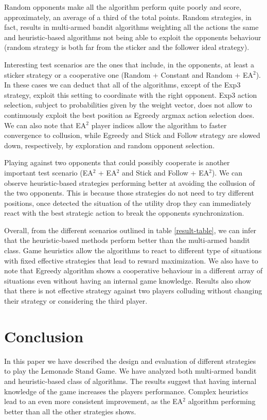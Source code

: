 \documentclass[runningheads]{llncs}
\begin{document}
Random opponents make all the algorithm perform quite
poorly and score, approximately, an average of a third of the total
points. Random strategies, in fact, results in multi-armed bandit
algorithms weighting all the actions the same and heuristic-based
algorithms not being able to exploit the opponents behaviour (random
strategy is both far from the sticker and the follower ideal strategy).

Interesting test scenarios are the ones that include, in the
opponents, at least a sticker strategy or a cooperative one (Random +
Constant and Random + EA$^2$). In these cases we can deduct that all
of the algorithms, except of the Exp3 strategy, exploit this setting
to coordinate with the right opponent. Exp3 action selection, subject
to probabilities given by the weight vector, does not allow to
continuously exploit the best position as Egreedy argmax action
selection does. We can also note that EA$^2$ player indices allow the
algorithm to faster convergence to collusion, while Egreedy and
Stick and Follow strategy are slowed down, respectively, by
exploration and random opponent selection.

Playing against two opponents that could possibly cooperate is another
important test scenario (EA$^2$ + EA$^2$ and Stick and Follow +
EA$^2$). We can observe heuristic-based strategies performing better
at avoiding the collusion of the two opponents. This is because those
strategies do not need to try different positions, once detected the
situation of the utility drop they can immediately react with the best
strategic action to break the opponents synchronization. 

Overall, from the different scenarios outlined in table
\ref{result-table}, we can infer that the heuristic-based methods
perform better than the multi-armed bandit class. Game heuristics
allow the algorithms to react to different type of situations with
fixed effective strategies that lead to reward maximization. We also
have to note that Egreedy algorithm shows a cooperative behaviour in a
different array of situations even without having an internal game
knowledge. Results also show that there is not effective strategy
against two players colluding without changing their strategy or
considering the third player.

\section{Conclusion}
In this paper we have described the design and evaluation of different
strategies to play the Lemonade Stand Game. We have analyzed both
multi-armed bandit and heuristic-based class of algorithms. The
results suggest that having internal knowledge of the game increases
the players performance. Complex heuristics lead to an even more
consistent improvement, as the EA$^2$ algorithm performing better than
all the other strategies shows.
\end{document}
